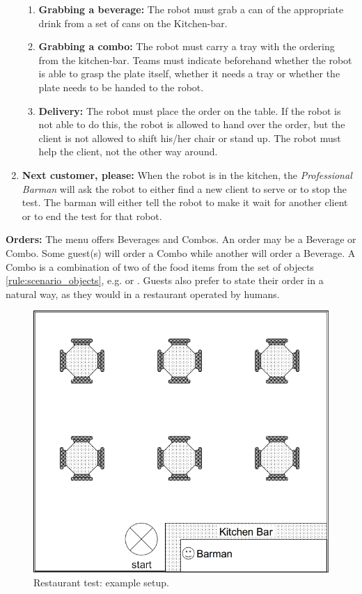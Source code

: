 \begin{enumerate}
\begin{enumerate}
		\item \textbf{Grabbing a beverage:} The robot must grab a can of the appropriate drink from a set of cans on the Kitchen-bar. 

		\item \textbf{Grabbing a combo:}  The robot must carry a tray with the ordering from the kitchen-bar. 
		Teams must indicate beforehand whether the robot is able to grasp the plate itself, whether it needs a tray or whether the plate needs to be handed to the robot.
		
		\item \textbf{Delivery:} The robot must place the order on the table. 
		If the robot is not able to do this, the robot is allowed to hand over the order, but the client is not allowed to shift his/her chair or stand up. 
		The robot must help the client, not the other way around. 
	\end{enumerate}
	
	\item \textbf{Next customer, please:} When the robot is in the kitchen, the \textit{Professional Barman} will ask the robot to either find a new client to serve or to stop the test.
	The barman will either tell the robot  to make it wait for another client or  to end the test for that robot. 
\end{enumerate}

\textbf{Orders:} The menu offers Beverages and Combos. An order may be a Beverage or Combo. Some guest(s) will order a Combo while another will order a Beverage.
  A Combo is a combination of two of the food items from the set of objects \ref{rule:scenario_objects}, e.g.  or . 
  Guests also prefer to state their order in a natural way, as they would in a restaurant operated by humans.
  
\begin{figure}[tbp]
	\centering
	\includegraphics[width=0.5\columnwidth]{images/restaurant.png}
	\caption{Restaurant test: example setup.}
	\label{fig:restaurant}
\end{figure}

